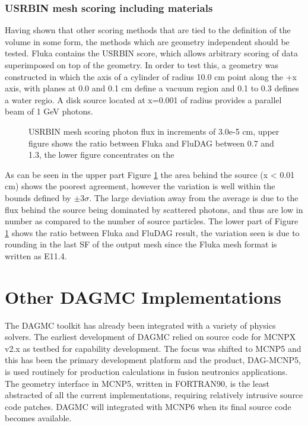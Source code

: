 \documentclass{anstrans}
\begin{document}
\subsubsection*{USRBIN mesh scoring including materials}
Having shown that other scoring methods that are tied to the definition of
the volume in some form, the methods which are geometry independent should
be tested. Fluka contains the USRBIN score, which allows arbitrary scoring
of data superimposed on top of the geometry. In order to test this, a geometry
was constructed in which the axis of a cylinder of radius 10.0 cm point along the
+x axis, with planes at 0.0 and 0.1 cm define a vacuum region and 0.1 to 0.3 
defines a water regio. A disk  source located at x=0.001 of radius provides a parallel beam of 1 GeV 
photons.
\begin{figure}
	\begin{center}
		\caption{USRBIN mesh scoring photon flux in increments
                  of 3.0e-5 cm, upper figure shows the ratio between
                  Fluka and FluDAG between 0.7 and 1.3, the lower
                  figure concentrates on the }
	\end{center}
	\label{mesh_phot}
\end{figure}
As can be seen in the upper part Figure \ref{mesh_phot} the area behind the source (x < 0.01 cm) 
shows the poorest agreement, however the variation is well within the bounds 
defined by $\pm 3\sigma$. The large deviation away from the average is due to the flux 
behind the source being dominated by scattered photons, and thus are low in number as compared
to the number of source particles.  The lower part of Figure \ref{mesh_phot} shows the ratio 
between Fluka and FluDAG result, the variation seen is due to rounding in the last SF of the output mesh since the Fluka mesh format is written as E11.4. 

\section{Other DAGMC Implementations}

The DAGMC toolkit has already been integrated with a variety of
physics solvers.  The earliest development of DAGMC relied on source
code for MCNPX v2.x as testbed for capability development.  The focus
was shifted to MCNP5 and this has been the primary development
platform and the product, DAG-MCNP5, is used routinely for production
calculations in fusion neutronics applications.  The geometry
interface in MCNP5, written in FORTRAN90, is the least abstracted of
all the current implementations, requiring relatively intrusive source
code patches.  DAGMC will integrated with MCNP6 when its final source
code becomes available.
\end{document}
